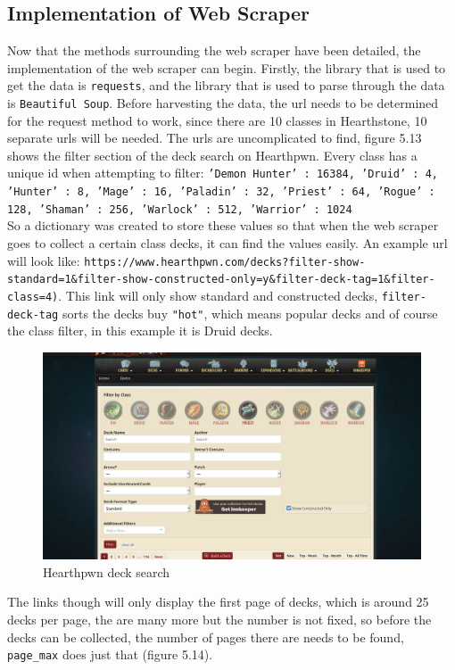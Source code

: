 \documentclass{report} %
\begin{document}
\subsection{Implementation of Web Scraper}
Now that the methods surrounding the web scraper have been detailed, the implementation of the web scraper can begin. Firstly, the library that is used to get the data is \texttt{requests}, and the library that is used to parse through the data is \texttt{Beautiful Soup}. Before harvesting the data, the url needs to be determined for the request method to work, since there are 10 classes in Hearthstone, 10 separate urls will be needed. The urls are uncomplicated to find, figure 5.13 shows the filter section of the deck search on Hearthpwn. Every class has a unique id when attempting to filter: \texttt{'Demon Hunter' : 16384,
          'Druid' : 4,
          'Hunter' : 8,
          'Mage' : 16,
          'Paladin' : 32,
          'Priest' : 64, 
          'Rogue' : 128,
          'Shaman' : 256,
          'Warlock' : 512,
          'Warrior' : 1024}\\
So a dictionary was created to store these values so that when the web scraper goes to collect a certain class decks, it can find the values easily. An example url will look like: \nolinkurl{https://www.hearthpwn.com/decks?filter-show-standard=1&filter-show-constructed-only=y&filter-deck-tag=1&filter-class=4)}. This link will only show standard and constructed decks, \texttt{filter-deck-tag} sorts the decks buy \texttt{"hot"}, which means popular decks and of course the class filter, in this example it is Druid decks.
\begin{figure}[H]
\centering
\includegraphics[width=1\textwidth]{HSpwnDecks}
\caption{Hearthpwn deck search\protect}
 \label{board}
\end{figure}

The links though will only display the first page of decks, which is around 25 decks per page, the are many more but the number is not fixed, so before the decks can be collected, the number of pages there are needs to be found, \nolinkurl{page_max} does just that (figure 5.14).
\end{document}
